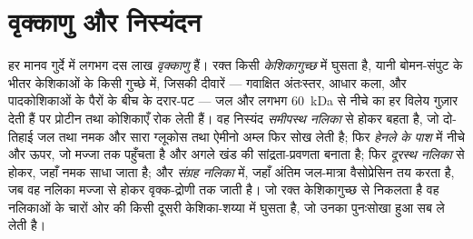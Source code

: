 \section{वृक्काणु और निस्यंदन}

\begin{definition}[वृक्काणु]\label{def:b3:renal-osmoregulation:nephron}
हर मानव गुर्दे में लगभग दस लाख \emph{वृक्काणु} हैं। रक्त किसी
\emph{केशिकागुच्छ} में घुसता है, यानी बोमन-संपुट के भीतर केशिकाओं के
किसी गुच्छे में, जिसकी दीवारें --- गवाक्षित अंतःस्तर, आधार कला, और
पादकोशिकाओं के पैरों के बीच के दरार-पट --- जल और लगभग \qty{60}{kDa} से
नीचे का हर विलेय गुज़ार देती हैं पर प्रोटीन तथा कोशिकाएँ रोक लेती हैं।
वह निस्यंद \emph{समीपस्थ नलिका} से होकर बहता है, जो दो-तिहाई जल तथा
नमक और सारा ग्लूकोस तथा ऐमीनो अम्ल फिर सोख लेती है; फिर \emph{हेनले के
पाश} में नीचे और ऊपर, जो मज्जा तक पहुँचता है और अगले खंड की
सांद्रता-प्रवणता बनाता है; फिर \emph{दूरस्थ नलिका} से होकर, जहाँ नमक
साधा जाता है; और \emph{संग्रह नलिका} में, जहाँ अंतिम जल-मात्रा
वैसोप्रेसिन तय करता है, जब वह नलिका मज्जा से होकर वृक्क-द्रोणी तक जाती
है। जो रक्त केशिकागुच्छ से निकलता है वह नलिकाओं के चारों ओर की किसी
दूसरी केशिका-शय्या में घुसता है, जो उनका पुनःसोखा हुआ सब ले लेती है।
\end{definition}

